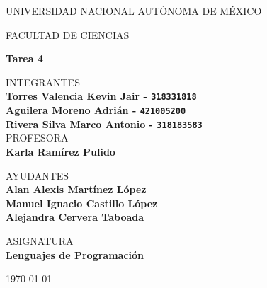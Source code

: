 \documentclass{article}
\begin{document}
	\begin{center}
	\vspace{0.8cm}
	\LARGE
	UNIVERSIDAD NACIONAL AUTÓNOMA DE MÉXICO

	\vspace{0.7cm}
	\LARGE
	FACULTAD DE CIENCIAS

	\vspace{0.8 cm}
	\Large
	\textbf{Tarea 4}

	\vspace{0.8 cm}
	\normalsize
	INTEGRANTES \\
	\vspace{.2cm}
	\large
	\textbf{Torres Valencia Kevin Jair - \texttt{318331818}}\\
	\textbf{Aguilera Moreno Adrián - \texttt{421005200}}\\
	\textbf{Rivera Silva Marco Antonio - \texttt{318183583}}\\

	\vspace{1 cm}
	\normalsize
	PROFESORA \\
	\vspace{.2cm}
	\large
	\textbf{Karla Ramírez Pulido}

	\vspace{1 cm}
	AYUDANTES \\
	\vspace{.2cm}
	\large
	\textbf{Alan Alexis Martínez López}\\
	\textbf{Manuel Ignacio Castillo López}\\
	\textbf{Alejandra Cervera Taboada}
	\vspace{1.3cm}

	\normalsize
	ASIGNATURA \\
	\vspace{.2cm}
	\large
	\textbf{Lenguajes de Programación}

	\vspace{1 cm}
	\today
	\end{center}

	\newpage
	
	
	
	
	
\end{document}
